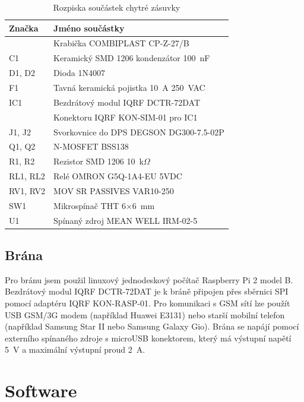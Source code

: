 \documentclass[12pt,a4paper,oneside]{article}
\begin{document}
\begin{table}[H]
	\centering
	\begin{tabular}{|l|l|}
		\hline 
		\textbf{Značka} & \textbf{Jméno součástky} \\ 
		\hline 
		\hline 
		~ & Krabička COMBIPLAST CP-Z-27/B \\ 
		\hline 
		C1 & Keramický SMD\index[zkr]{SMD!Surface-mounted device|textit} 1206 kondenzátor 100~nF \\ 
		\hline 
		D1, D2 & Dioda 1N4007 \\ 
		\hline 
		F1 & Tavná keramická pojistka 10~A 250~VAC \\ 
		\hline 
		IC1 & Bezdrátový modul IQRF DCTR-72DAT \\ 
		\hline 
		~ & Konektoru IQRF KON-SIM-01 pro IC1 \\ 
		\hline 
		J1, J2 & Svorkovnice do DPS DEGSON DG300-7.5-02P \\ 
		\hline 
		Q1, Q2 & N-MOSFET BSS138 \\ 
		\hline 
		R1, R2 & Rezistor SMD 1206 10~k$\Omega$ \\ 
		\hline 
		RL1, RL2 & Relé OMRON G5Q-1A4-EU 5VDC \\ 
		\hline 
		RV1, RV2 & MOV SR PASSIVES VAR10-250 \\ 
		\hline 
		SW1 & Mikrospínač THT 6$\times$6~mm \\ 
		\hline 
		U1 & Spínaný zdroj MEAN WELL IRM-02-5 \\ 
		\hline 
	\end{tabular}
	\caption{Rozpiska součástek chytré zásuvky}\label{table:rozpiska-soucastek}
\end{table}

\subsection{Brána}

Pro bránu jsem použil linuxový jednodeskový počítač Raspberry Pi 2 model B. Bezdrátový modul IQRF DCTR-72DAT je k bráně připojen přes sběrnici SPI pomocí adaptéru IQRF KON-RASP-01. Pro komunikaci s GSM sítí lze použít USB GSM/3G modem (například Huawei E3131) nebo starší mobilní telefon (například Samsung Star II nebo Samsung Galaxy Gio). Brána se napájí pomocí externího spínaného zdroje s microUSB konektorem, který má výstupní napětí 5~V a maximální výstupní proud 2~A.

\section{Software}
\end{document}
